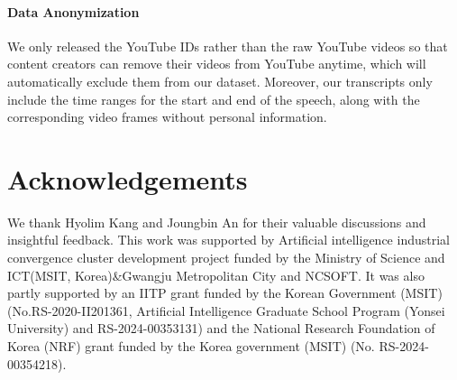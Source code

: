 \paragraph{Data Anonymization} We only released the YouTube IDs rather than the raw YouTube videos so that content creators can remove their videos from YouTube anytime, which will automatically exclude them from our dataset. Moreover, our transcripts only include the time ranges for the start and end of the speech, along with the corresponding video frames without personal information.

\section{Acknowledgements}
\label{sec:acknowledgement}

We thank Hyolim Kang and Joungbin An for their valuable discussions and insightful feedback.
This work was supported by Artificial intelligence industrial convergence cluster development project funded by the Ministry of Science and ICT(MSIT, Korea)\&Gwangju Metropolitan City and NCSOFT. It was also partly supported by an IITP grant funded by the Korean Government (MSIT) (No.RS-2020-II201361, Artificial Intelligence Graduate School Program (Yonsei University) and RS-2024-00353131) and the National Research Foundation of Korea (NRF) grant funded by the Korea government (MSIT) (No. RS-2024-00354218).






